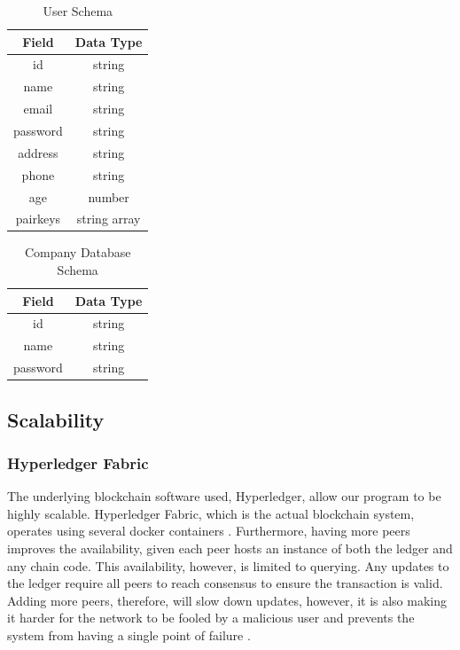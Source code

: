\documentclass[11pt,journal]{IEEEtran}
\begin{document}
\begin{table}
  \renewcommand{\arraystretch}{1.3}
  \caption{User Schema}
  \label{tab:UserSchema}
  \centering
  \begin{tabular}{|c|c|}
    \hline
    Field & Data Type\\
    \hline
    id & string \\
    name & string \\
    email & string \\
    password & string \\
    address & string \\
    phone & string \\
    age & number \\
    pairkeys & string array \\
    \hline
  \end{tabular}
\end{table}

\begin{table}
  \renewcommand{\arraystretch}{1.3}
  \caption{Company Database Schema}
  \label{tab:CompanyDBSchema}
  \centering
  \begin{tabular}{|c|c|}
    \hline
    Field & Data Type\\
    \hline
    id & string \\
    name & string \\
    password & string \\
    \hline
  \end{tabular}
\end{table}

\subsection{Scalability} \label{sec:scale}

\subsubsection{Hyperledger Fabric}

The underlying blockchain software used, Hyperledger, allow our program to be highly scalable. Hyperledger Fabric, which is the actual blockchain system, operates using several docker containers \cite{WhyHyper54:online}. Furthermore, having more peers improves the availability, given each peer hosts an instance of both the ledger and any chain code. This availability, however, is limited to querying. Any updates to the ledger require all peers to reach consensus to ensure the transaction is valid. Adding more peers, therefore, will slow down updates, however, it is also making it harder for the network to be fooled by a malicious user and prevents the system from having a single point of failure \cite{WhyHyper54:online}.
\end{document}
